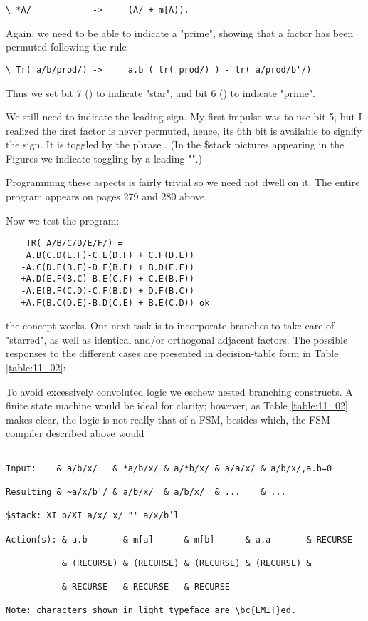 \begin{verbatim}
\ *A/            ->     (A/ + m[A)).
\end{verbatim}

Again, we need to be able to indicate a "prime", showing that a factor has been permuted following the rule

\begin{verbatim}
\ Tr( a/b/prod/) ->     a.b ( tr( prod/) ) - tr( a/prod/b'/)
\end{verbatim}

Thus we set bit 7 () to indicate "star", and bit 6 () to indicate "prime".

We still need to indicate the leading sign. My first impulse was to use bit 5, but I realized the first factor is never permuted, hence, its 6th bit is available to signify the sign. It is toggled by the phrase . (In the \$stack pictures appearing in the Figures we indicate toggling by a leading "\bc{\~}".)

Programming these aspects is fairly trivial so we need not dwell on it. The entire program appears on pages 279 and 280 above.

Now we test the program:

\begin{lstlisting}
    TR( A/B/C/D/E/F/) =
    A.B(C.D(E.F)-C.E(D.F) + C.F(D.E))
   -A.C(D.E(B.F)-D.F(B.E) + B.D(E.F))
   +A.D(E.F(B.C)-B.E(C.F) + C.E(B.F))
   -A.E(B.F(C.D)-C.F(B.D) + D.F(B.C))
   +A.F(B.C(D.E)-B.D(C.E) + B.E(C.D)) ok
\end{lstlisting}

 the concept works. Our next task is to incorporate branches to take care of "starred", as well as identical and/or orthogonal adjacent factors. The possible responses to the different cases are presented in decision-table form in Table \ref{table:11_02}:

To avoid excessively convoluted logic we eschew nested branching constructs. A finite state machine would be ideal for clarity; however, as Table \ref{table:11_02} makes clear, the logic is not really that of a FSM, besides which, the FSM compiler described above would

\begin{verbatim}

Input:    & a/b/x/   & *a/b/x/ & a/*b/x/ & a/a/x/ & a/b/x/,a.b=0

Resulting & ~a/x/b'/ & a/b/x/  & a/b/x/  & ...    & ...

$stack: XI b/XI a/x/ x/ "' a/x/b’l

Action(s): & a.b       & m[a]      & m[b]      & a.a       & RECURSE

           & (RECURSE) & (RECURSE) & (RECURSE) & (RECURSE) &

           & RECURSE   & RECURSE   & RECURSE

Note: characters shown in light typeface are \bc{EMIT}ed.
\end{verbatim}


